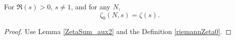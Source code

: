 \begin{lemma}
\label{Zeta0EqZeta}
\leanok
For $\Re(s)>0$, $s\ne1$, and for any $N$,
  $$
  \zeta_0(N,s) = \zeta(s).
  $$
\end{lemma}
\begin{proof}
\leanok
Use Lemma \ref{ZetaSum_aux2} and the Definition \ref{riemannZeta0}.
\end{proof}
